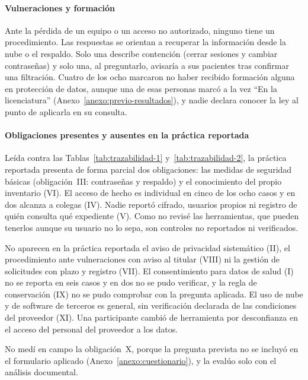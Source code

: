 \documentclass[12pt, a4paper]{article}
\begin{document}
\paragraph{Vulneraciones y formación} Ante la pérdida de un equipo o un acceso no autorizado, ninguno tiene un
procedimiento. Las respuestas se orientan a recuperar la información
desde la nube o el respaldo. Solo una describe contención (cerrar
sesiones y cambiar contraseñas) y solo una, al preguntarlo, avisaría a
sus pacientes tras confirmar una filtración. Cuatro de los ocho marcaron
no haber recibido formación alguna en protección de datos, aunque una
de esas personas marcó a la vez ``En la licenciatura''
(Anexo~\ref{anexo:previo-resultados}), y nadie declara conocer la ley al
punto de aplicarla en su consulta.
 
\paragraph{Obligaciones presentes y ausentes en la práctica reportada}
Leída contra las Tablas~\ref{tab:trazabilidad-1}
y~\ref{tab:trazabilidad-2}, la práctica reportada presenta de forma
parcial dos obligaciones: las medidas de seguridad básicas
(obligación~III: contraseñas y respaldo) y el conocimiento
del propio inventario (VI). El acceso de hecho es individual en cinco de
los ocho casos y en dos alcanza a colegas (IV). Nadie reportó cifrado, usuarios propios ni registro de quién consulta qué expediente (V). Como no revisé las herramientas, que pueden tenerlos aunque su usuario no lo sepa, son controles no reportados ni verificados.

No aparecen en la práctica reportada el aviso de privacidad sistemático (II), el procedimiento ante
vulneraciones con aviso al titular (VIII) ni la gestión de solicitudes con
plazo y registro (VII). El consentimiento para datos de salud (I) no se reporta en seis casos y en dos no se pudo verificar, y la regla de conservación (IX) no se pudo comprobar con la pregunta aplicada. El uso
de nube y de software de terceros es general, sin verificación declarada
de las condiciones del proveedor (XI). Una participante cambió de
herramienta por desconfianza en el acceso del personal del
proveedor a los datos.

No medí en campo la obligación~X, porque la pregunta prevista no se
incluyó en el formulario aplicado (Anexo~\ref{anexo:cuestionario}), y la evalúo solo con el análisis documental.
 
\end{document}
